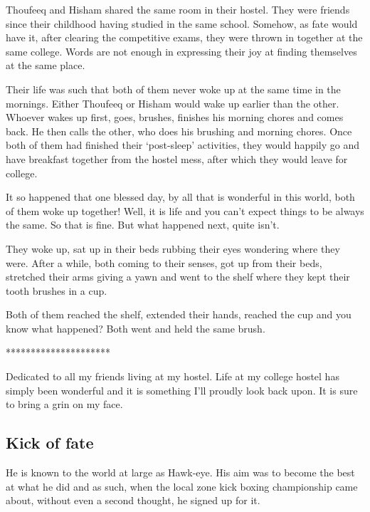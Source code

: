 \documentclass[twoside,11pt,titlepage]{article}
\begin{document}
Thoufeeq and Hisham shared the same room in their hostel. They were friends since their childhood having studied in the same school. Somehow, as fate would have it, after clearing the competitive exams, they were thrown in together at the same college. Words are not enough in expressing their joy at finding themselves at the same place. 

Their life was such that both of them never woke up at the same time in the mornings. Either Thoufeeq or Hisham would wake up earlier than the other. Whoever wakes up first, goes, brushes, finishes his morning chores and comes back. He then calls the other, who does his brushing and morning chores. Once both of them had finished their `post-sleep' activities, they would happily go and have breakfast together from the hostel mess, after which they would leave for college.

It so happened that one blessed day, by all that is wonderful in this world, both of them woke up together! Well, it is life and you can't expect things to be always the same. So that is fine. But what happened next, quite isn't.

They woke up, sat up in their beds rubbing their eyes wondering where they were. After a while, both coming to their senses, got up from their beds, stretched their arms giving a yawn and went to the shelf where they kept their tooth brushes in a cup.

Both of them reached the shelf, extended their hands, reached the cup and you know what happened? Both went and held the same brush.

\bigskip
\begin{center}
*********************
\end{center}

Dedicated to all my friends living at my hostel. Life at my college hostel has simply been wonderful and it is something I'll proudly look back upon. It is sure to bring a grin on my face.


\newpage
\begin{center}
  \section{Kick of fate}
\end{center}
\bigskip
\bigskip
\bigskip

He is known to the world at large as Hawk-eye. His aim was to become the best at what he did and as such, when the local zone kick boxing championship came about, without even a second thought, he signed up for it.
\end{document}
